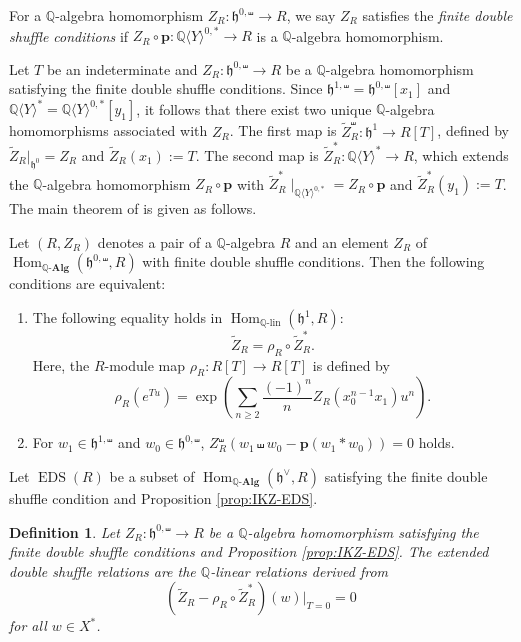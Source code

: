 \documentclass[15pt,oneside,reqno]{amsart}
\newcounter{dfcounter}
\newtheorem{df}{Definition}[dfcounter]
\theoremstyle{remark}{
\newtheorem{lem}[df]{Lemma}
\newtheorem{prop}[df]{Proposition}
\newtheorem{ex}[df]{Example}
\newtheorem{rmk}[df]{Remark}
}
\DeclareMathOperator{\Hom}{Hom}
\newcommand{\ide}[1]{\mathfrak{#1}}
\newcommand{\Q}{\mathbb{Q}}
\DeclareMathOperator{\EDS}{EDS}
\newcommand{\Qalg}{\mathbb{Q}\text{-}\mathrm{\mathbf{Alg}}}
\begin{document}
For a $\mathbb{Q}$-algebra homomorphism $Z_R : \ide{h}^{0,\shuffle} \rightarrow R$, we say $Z_R$ satisfies the \textit{finite double shuffle conditions} if $Z_R \circ \mathbf{p} : \Q\langle Y \rangle^{0,*} \rightarrow R$ is a $\Q$-algebra homomorphism.

Let $T$ be an indeterminate and $Z_R : \ide{h}^{0,\shuffle} \rightarrow R$ be a $\Q$-algebra homomorphism satisfying the finite double shuffle conditions.
Since $\ide{h}^{1,\shuffle} = \ide{h}^{0,\shuffle}[x_1]$ and $\Q\langle Y\rangle^{*} = \Q\langle Y\rangle^{0,*}[y_1]$, it follows that there exist two unique $\Q$-algebra homomorphisms associated with $Z_R$.
The first map is $\widetilde{Z}^{\shuffle}_R  : \ide{h}^1 \rightarrow R[T]$, defined by $\widetilde{Z}_R |_{\ide{h}^0} =  Z_R$ and $\widetilde{Z}_R(x_1) := T$. The second map is $ \widetilde{Z}^*_R : \Q\langle Y\rangle^{*} \rightarrow R$, which extends the $\mathbb{Q}$-algebra homomorphism $Z_R \circ \mathbf{p}$ with $\widetilde{Z}^*_R \mid_{\Q\langle Y\rangle^{0,*}} = Z_R \circ \mathbf{p}$ and $\widetilde{Z}^*_R(y_1) := T$.
The main theorem of \cite{Ihara-Kaneko-Zagier} is given as follows.

\begin{prop}\label{prop:IKZ-EDS}
Let $(R, Z_R)$ denotes a pair of a $\Q$-algebra $R$ and an element $Z_R$ of $\Hom_{\Qalg}(\ide{h}^{0,\shuffle},R)$ with finite double shuffle conditions. Then the following conditions are equivalent:
\begin{enumerate}
\item 
The following equality holds in $\Hom_{\text{$\Q$-lin}} (\ide{h}^{1}, R)$:
\[
\widetilde{Z}_R = \rho_R \circ \widetilde{Z}^*_R.
\]
Here, the $R$-module map $\rho_R : R[T] \rightarrow R[T]$ is defined by
\[
\rho_R (e^{Tu}) = \exp \left(\sum_{n\ge 2} \frac{(-1)^n}{n} Z_R(x_0^{n-1}x_1)u^n \right).
\]
\item For $w_1\in \ide{h}^{1,\shuffle}$ and $w_0 \in \ide{h}^{0,\shuffle}$, $Z_R^{\shuffle}(w_1\shuffle w_0 - \mathbf{p}(w_1 * w_0)) = 0$ holds.
\end{enumerate}
\end{prop}

Let $\EDS(R)$ be a subset of $\Hom_{\Qalg}(\ide{h}^{\vee}, R)$ satisfying the finite double shuffle condition and Proposition \ref{prop:IKZ-EDS}.


\begin{df}\label{df:EDS}
Let $Z_{R} : \ide{h}^{0,\shuffle} \rightarrow R$ be a $\mathbb{Q}$-algebra homomorphism satisfying the finite double shuffle conditions and Proposition \ref{prop:IKZ-EDS}. The \textit{extended double shuffle relations} are the $\Q$-linear relations derived from
\[
(\widetilde{Z}_{R} - \rho_{R} \circ \widetilde{Z}^*_{R})(w) |_{T = 0} = 0
\]
for all $w\in X^*$.
\end{df}
\end{document}
